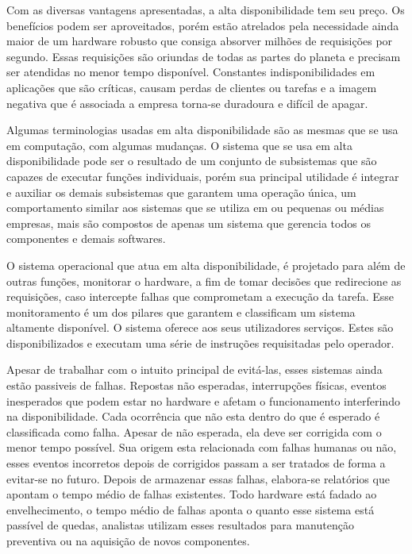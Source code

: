 Com as diversas vantagens apresentadas, a alta disponibilidade tem seu preço. Os benefícios podem ser aproveitados, 
porém estão atrelados pela necessidade ainda maior de um hardware robusto que consiga absorver milhões de requisições por
segundo. Essas requisições são oriundas de todas as partes do planeta e precisam ser atendidas no menor tempo disponível.
Constantes indisponibilidades em aplicações que são críticas, causam perdas de clientes ou tarefas e a imagem negativa que 
é associada a empresa torna-se duradoura e difícil de apagar.


Algumas terminologias usadas em alta disponibilidade são as mesmas que se usa em computação, com algumas mudanças. 
O sistema que se usa em alta disponibilidade pode ser o resultado de um conjunto de subsistemas que são capazes de executar
funções individuais, porém sua principal utilidade é integrar e auxiliar os demais subsistemas que garantem uma operação única,
um comportamento similar aos sistemas que se utiliza em ou pequenas ou médias empresas, mais são compostos de apenas um sistema
que gerencia todos os componentes e demais softwares.


O sistema operacional que atua em alta disponibilidade, é projetado para além de outras funções, monitorar o hardware, a fim 
de tomar decisões que redirecione as requisições, caso intercepte falhas que comprometam a execução da tarefa. Esse 
monitoramento é um dos pilares que garantem e classificam um sistema altamente disponível.
O sistema oferece aos seus utilizadores serviços. Estes são disponibilizados e executam uma série de instruções requisitadas
pelo operador.


Apesar de trabalhar com o intuito principal de evitá-las, esses sistemas ainda estão passiveis de falhas. Repostas não 
esperadas, interrupções físicas, eventos inesperados que podem estar no hardware e afetam o funcionamento interferindo na
disponibilidade. Cada ocorrência que não esta dentro do que é esperado é classificada como falha. Apesar de não esperada,
ela deve ser corrigida com o menor tempo possível. Sua origem esta relacionada com falhas humanas ou não, esses eventos
incorretos depois de corrigidos passam a ser tratados de forma a evitar-se no futuro. Depois de armazenar essas falhas,
elabora-se relatórios que apontam o tempo médio de falhas existentes. Todo hardware está fadado ao envelhecimento, o tempo
médio de falhas aponta o quanto esse sistema está passível de quedas, analistas utilizam esses resultados para manutenção
preventiva ou na aquisição de novos componentes.


